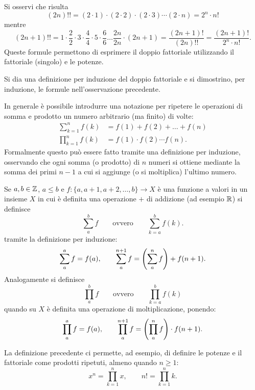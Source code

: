 \begin{remark}
Si osservi che risulta
\[
  (2n)!! = (2\cdot 1) \cdot (2\cdot 2) \cdot (2\cdot 3) \cdots (2\cdot n)
        = 2^n \cdot n!
\]
mentre
\[
  (2n+1)!! = 1 \cdot \frac{2}{2} \cdot 3 \cdot \frac{4}{4}
\cdot 5 \cdot \frac{6}{6} \dots \frac{2n}{2n} \cdot (2n+1)
= \frac{(2n+1)!}{(2n)!!}
 = \frac{(2n+1)!}{2^n \cdot n!}.
\]
Queste formule permettono di esprimere il doppio fattoriale utilizzando
il fattoriale (singolo) e le potenze.
\end{remark}

\begin{exercise}
Si dia una definizione per induzione del doppio fattoriale
e si dimostrino, per induzione, le formule nell'osservazione precedente.
\end{exercise}

In generale è possibile introdurre una notazione per ripetere le operazioni
di somma e prodotto un numero arbitrario (ma finito) di volte:
\begin{align*}
  \sum_{k=1}^n f(k) &= f(1) + f(2) + \dots + f(n) \\
  \prod_{k=1}^n f(k) &= f(1) \cdot f(2) \cdots f(n).
\end{align*}
Formalmente questo può essere fatto tramite una definizione per induzione,
osservando che ogni somma (o prodotto) di $n$ numeri si ottiene mediante
la somma dei primi $n-1$ a cui si aggiunge (o si moltiplica) l'ultimo numero.

\begin{definition}
Se $a,b\in \mathbb Z$, $a\le b$ e $f\colon \{a, a+1, a+2, \dots, b\}\to X$
è una funzione a valori in un insieme $X$ in cui è definita una
operazione $+$ di addizione (ad esempio $\mathbb R$)
si definisce
\[
  \sum_a^b f
  \qquad \text{ovvero} \qquad
  \sum_{k=a}^b f(k).
\]
tramite la definizione per induzione:
\[
    \displaystyle \sum_a^a f = f(a), \qquad
    \displaystyle \sum_{a}^{n+1} f = {\left( \sum_a^n f \right)} + f(n+1).
\]
Analogamente si definisce
\[
  \prod_a^b f
  \qquad\text{ovvero}\qquad
  \prod_{k=a}^b f(k)
\]
quando su $X$ è definita una operazione di moltiplicazione,
ponendo:
\[
    \displaystyle \prod_{a}^a f = f(a), \qquad
    \displaystyle \prod_{a}^{n+1} f = {\left( \prod_a^n f \right)} \cdot f(n+1).
\]
\end{definition}

La definizione precedente ci permette, ad esempio, di definire le potenze e il fattoriale
come prodotti ripetuti, almeno quando $n\ge 1$:
\[
  x^n = \prod_{k=1}^n x, \qquad
  n! = \prod_{k=1}^n k.
\]

